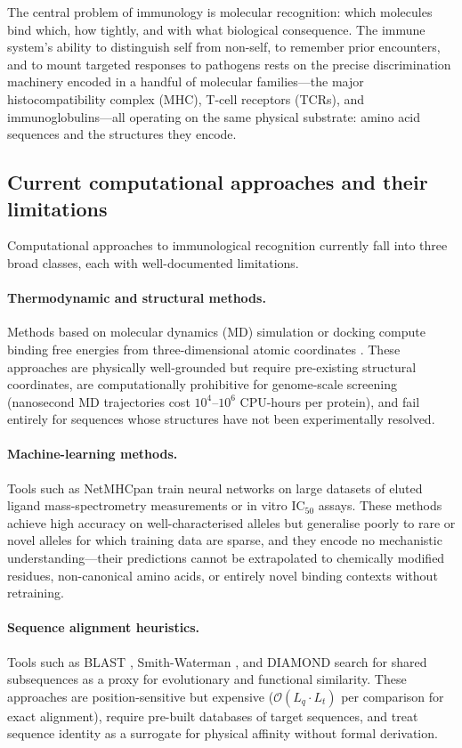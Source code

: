 \documentclass[twocolumn,11pt,a4paper]{article}
\theoremstyle{definition}
\theoremstyle{remark}
\begin{document}
The central problem of immunology is molecular recognition: which molecules bind
which, how tightly, and with what biological consequence. The immune system's
ability to distinguish self from non-self, to remember prior encounters, and to
mount targeted responses to pathogens rests on the precise discrimination
machinery encoded in a handful of molecular families---the major
histocompatibility complex (MHC), T-cell receptors (TCRs), and
immunoglobulins---all operating on the same physical substrate: amino acid
sequences and the structures they encode.

\subsection{Current computational approaches and their limitations}

Computational approaches to immunological recognition currently fall into three
broad classes, each with well-documented limitations.

\paragraph{Thermodynamic and structural methods.}
Methods based on molecular dynamics (MD) simulation or docking compute binding
free energies from three-dimensional atomic coordinates
\citep{bjorkman1987,neefjes2011}. These approaches are physically well-grounded
but require pre-existing structural coordinates, are computationally prohibitive
for genome-scale screening (nanosecond MD trajectories cost $10^4$--$10^6$
CPU-hours per protein), and fail entirely for sequences whose structures have
not been experimentally resolved.

\paragraph{Machine-learning methods.}
Tools such as NetMHCpan \citep{nielsen2007} train neural networks on large
datasets of eluted ligand mass-spectrometry measurements or in vitro
$\text{IC}_{50}$ assays. These methods achieve high accuracy on
well-characterised alleles but generalise poorly to rare or novel alleles for
which training data are sparse, and they encode no mechanistic
understanding---their predictions cannot be extrapolated to chemically modified
residues, non-canonical amino acids, or entirely novel binding contexts without
retraining.

\paragraph{Sequence alignment heuristics.}
Tools such as BLAST \citep{altschul1990}, Smith-Waterman \citep{smith1981},
and DIAMOND \citep{buchfink2015} search for shared subsequences as a proxy for
evolutionary and functional similarity. These approaches are position-sensitive
but expensive ($\mathcal{O}(L_q \cdot L_t)$ per comparison for exact
alignment), require pre-built databases of target sequences, and treat sequence
identity as a surrogate for physical affinity without formal derivation.
\end{document}
